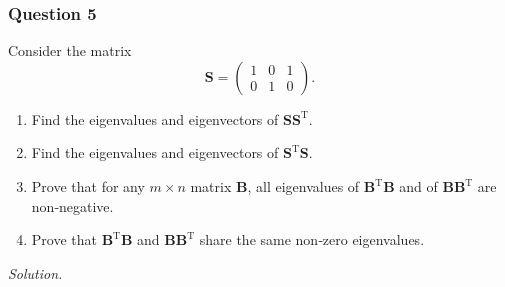 \documentclass[12pt]{article}
\begin{document}
\subsubsection*{Question 5}
Consider the matrix
\[
  \mathbf{S}=\begin{pmatrix}
        1 & 0 & 1\\
        0 & 1 & 0
     \end{pmatrix}.
\]
\begin{enumerate}[label=\textbf{(\alph*)}]
\itemsep 0em
  \item Find the eigenvalues and eigenvectors of $\mathbf{SS}^\text{T}$.
  \item Find the eigenvalues and eigenvectors of $\mathbf{S}^\text{T}\mathbf{S}$.
  \item Prove that for any $m\times n$ matrix $\mathbf{B}$, all eigenvalues of $\mathbf{B}^{\text{T}}\mathbf{B}$ and of $\mathbf{BB}^{\text{T}}$ are non‑negative.
  \item Prove that $\mathbf{B}^\text{T}\mathbf{B}$ and $\mathbf{BB}^{\text{T}}$ share the same non‑zero eigenvalues.
\end{enumerate}
\noindent\emph{Solution.}
\end{document}

